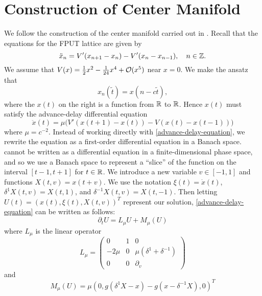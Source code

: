\section{Construction of Center Manifold}
We follow the construction of the center manifold carried out in \cite{iooss2000travelling}. Recall that the equations for the FPUT lattice are given by
\begin{equation}
	\ddot x_n = V'(x_{n+1} - x_n) - V'(x_n - x_{n-1}), \quad n\in\mathbb{Z}.
\end{equation}
We assume that \(V(x) = \frac 12 x^2 - \frac 1 {24} x^4 + \mathcal{O}(x^5)\) near \(x=0\). We make the ansatz that 
\begin{equation}
	x_n(\tilde t) = x(n-c\tilde t),
\end{equation}
where the \(x(t)\) on the right is a function from \(\mathbb{R}\) to \(\mathbb{R}\). Hence \(x(t)\) must satisfy the advance-delay differential equation
\begin{equation}\label{advance-delay-equation}
	\ddot x (t) = \mu \Big(V'(x(t+1) - x(t)) - V(x(t) - x(t-1)) \Big)
\end{equation}
where \(\mu = c^{-2}\). Instead of working directly with \cref{advance-delay-equation}, we rewrite the equation as a first-order differential equation in a Banach space.  cannot be written as a differential equation in a finite-dimensional phase space, and so we use a Banach space to represent a ``slice'' of the function on the interval \([t-1,t+1]\) for \(t\in\mathbb{R}\). We introduce a new variable \(v\in[-1,1]\) and functions \(X(t,v) = x(t+v)\). We use the notation \(\xi(t) = \dot x(t)\), \(\delta^1X(t,v) = X(t,1)\), and \(\delta^{-1} X(t,v) = X(t,-1)\). Then letting \(U(t) = (x(t), \xi(t), X(t,v))^T\) represent our solution, \cref{advance-delay-equation} can be written as follows:
\begin{equation}\label{first-order-abstract-ode}
	\partial_t U = L_\mu U + M_\mu (U)
\end{equation}
where \(L_\mu\) is the linear operator
\begin{equation}
	L_\mu = \begin{pmatrix}
		0 & 1 & 0\\
		-2\mu & 0 & \mu(\delta^1 + \delta^{-1}) \\
		0 & 0 & \partial_v
	\end{pmatrix}
\end{equation}
and 
\begin{equation}
	M_\mu(U) = \mu (0, g(\delta^1X -x) - g(x- \delta^{-1} X), 0)^T
\end{equation}
